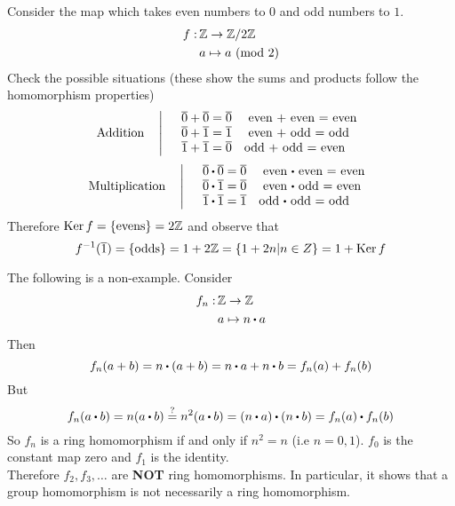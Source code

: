 \documentclass[../Main.tex]{subfiles}
\begin{document}
\begin{example}
	Consider the map which takes even numbers to $0$ and odd numbers to $1$.
	\begin{align*}
		f: \,&\mathbb{Z} \to \mathbb{Z}/2\mathbb{Z}\\
		&a \mapsto a \ (\mathrm{mod}\ 2)
	\end{align*}
	Check the possible situations (these show the sums and products follow the homomorphism properties)
	\begin{equation*}
	\text{Addition}  \quad \left|\quad\begin{array}{>$l<$}
	$\obar{0}+ \obar{0} = \obar{0}$ \quad
	even $+ $ even = even\\
	$\obar{0}+ \obar{1}= \obar{1}$ \quad
	even $+ $ odd = odd\\
	$\obar{1}+ \obar{1} = \obar{0}$\quad
	odd $+ $ odd = even
	\end{array}\right.
	\end{equation*}
	\begin{equation*}
	\text{Multiplication} \quad \left|\quad\begin{array}{>$l<$}
	$\obar{0}\rdot \obar{0} = \obar{0}$ \quad
	even $\rdot $ even = even\\
	$\obar{0}\rdot \obar{1}= \obar{0}$ \quad
	even $\rdot $ odd = even\\
	$\obar{1}\rdot \obar{1} = \obar{1}$\quad
	odd $\rdot $ odd = odd
	\end{array}\right.
	\end{equation*}
	Therefore $\operatorname{Ker} f = \{\text{evens}\} = 2\mathbb{Z}$ and observe that
	\[f^{-1}(\overline{1}) = \{ \text{odds}\} = 1+2\mathbb{Z} = \{1+2n | n\in Z\} = 1+\operatorname{Ker} f\]
\end{example}
\begin{example}
	The following is a non-example. Consider
	\begin{align*}
		f_n:\,& \Z \to \Z \\
		&a \mapsto n\rdot a
	\end{align*}
	Then
	\[f_n(a+b)=n\rdot (a+b)=n\rdot a+n\rdot b= f_n(a)+f_n(b)\]
	But 
	\[f_n(a\rdot b)=n(a\rdot b) \stackrel{?}{=} n^2(a\rdot b)=(n\rdot a)\rdot (n\rdot b)=f_n(a)\rdot f_n(b)\]
	So $f_n$ is a ring homomorphism if and only if $n^2=n$ (i.e $n=0,1$). $f_0$ is the constant map zero and $f_1$ is the identity.\\
	Therefore $f_2,f_3,\dots $ are \textbf{NOT} ring homomorphisms. In particular, it shows that a group homomorphism is not necessarily a ring homomorphism.
\end{example}
\end{document}
